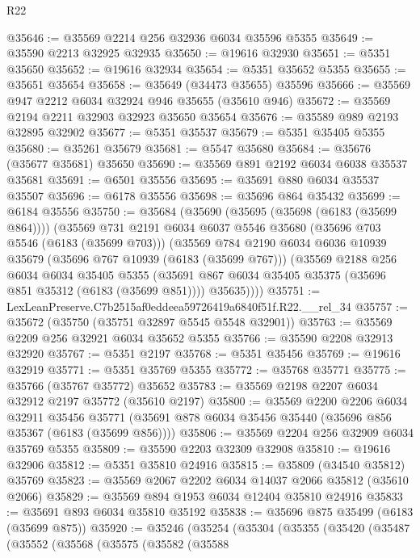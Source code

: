 \begin{lexlean}{R22}
\begin{coremodule}
@35646 := @35569 @2214 @256 @32936 @6034 @35596 @5355
@35649 := @35590 @2213 @32925 @32935
@35650 := @19616 @32930
@35651 := @5351 @35650
@35652 := @19616 @32934
@35654 := @5351 @35652 @5355
@35655 := @35651 @35654
@35658 := @35649 (@34473 @35655) @35596
@35666 := @35569 @947 @2212 @6034 @32924 @946 @35655 (@35610 @946)
@35672 := @35569 @2194 @2211 @32903 @32923 @35650 @35654
@35676 := @35589 @989 @2193 @32895 @32902
@35677 := @5351 @35537
@35679 := @5351 @35405 @5355
@35680 := @35261 @35679
@35681 := @5547 @35680
@35684 := @35676 (@35677 @35681) @35650
@35690 := @35569 @891 @2192 @6034 @6038 @35537 @35681
@35691 := @6501 @35556
@35695 := @35691 @880 @6034 @35537 @35507
@35696 := @6178 @35556
@35698 := @35696 @864 @35432
@35699 := @6184 @35556
@35750 := @35684
    (@35690
      (@35695 (@35698 (@6183 (@35699 @864))))
      (@35569
        @731
        @2191
        @6034
        @6037
        @5546
        @35680
        (@35696 @703 @5546 (@6183 (@35699 @703)))
        (@35569
          @784
          @2190
          @6034
          @6036
          @10939
          @35679
          (@35696 @767 @10939 (@6183 (@35699 @767)))
          (@35569
            @2188
            @256
            @6034
            @6034
            @35405
            @5355
            (@35691 @867 @6034 @35405 @35375 (@35696 @851 @35312 (@6183 (@35699 @851))))
            @35635))))
@35751 := LexLeanPreserve.C7b2515af0eddeea59726419a6840f51f.R22.__rel_34
@35757 := @35672 (@35750 (@35751 @32897 @5545 @5548 @32901))
@35763 := @35569 @2209 @256 @32921 @6034 @35652 @5355
@35766 := @35590 @2208 @32913 @32920
@35767 := @5351 @2197
@35768 := @5351 @35456
@35769 := @19616 @32919
@35771 := @5351 @35769 @5355
@35772 := @35768 @35771
@35775 := @35766 (@35767 @35772) @35652
@35783 := @35569 @2198 @2207 @6034 @32912 @2197 @35772 (@35610 @2197)
@35800 := @35569
    @2200
    @2206
    @6034
    @32911
    @35456
    @35771
    (@35691 @878 @6034 @35456 @35440 (@35696 @856 @35367 (@6183 (@35699 @856))))
@35806 := @35569 @2204 @256 @32909 @6034 @35769 @5355
@35809 := @35590 @2203 @32309 @32908
@35810 := @19616 @32906
@35812 := @5351 @35810 @24916
@35815 := @35809 (@34540 @35812) @35769
@35823 := @35569 @2067 @2202 @6034 @14037 @2066 @35812 (@35610 @2066)
@35829 := @35569 @894 @1953 @6034 @12404 @35810 @24916
@35833 := @35691 @893 @6034 @35810 @35192
@35838 := @35696 @875 @35499 (@6183 (@35699 @875))
@35920 := @35246
    (@35254
      (@35304
        (@35355
          (@35420
            (@35487
              (@35552
                (@35568
                  (@35575
                    (@35582
                      (@35588

\end{coremodule}
\end{lexlean}

